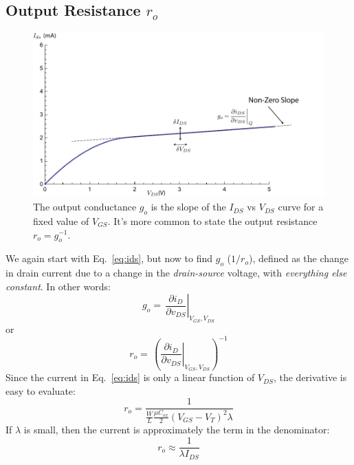 \subsection{Output Resistance \texorpdfstring{$r_o$}{}}
\begin{figure}[tb]
\centering
\includegraphics[width=.75\columnwidth]{ids_idsat_ro}
\caption{The output conductance $g_o$ is the slope of the $I_{DS}$ vs $V_{DS}$ curve for a fixed value of $V_{GS}$.  It's more common to state the output resistance $r_o = g_o^{-1}$.}
\label{fig:ids_idsat_ro}
\end{figure}
We again start with Eq.~\ref{eq:ids}, but now to find $g_o$ ($1/r_o$), defined as the change in drain current due to a change in the \textit{drain-source} voltage, with \textit{everything else constant}.  In other words:
    \begin{equation}
        {g_o} = \,{ {{{\left. {\frac{{\partial {i_D}}}{{\partial {v_{DS}}}}} \right|}_{{V_{GS}},{V_{DS}}}}} }
    \end{equation}
or
    \begin{equation}
        {r_o} = \,{\left( {{{\left. {\frac{{\partial {i_D}}}{{\partial {v_{DS}}}}} \right|}_{{V_{GS}},{V_{DS}}}}} \right)^{ - 1}}
    \end{equation}
Since the current in Eq.~\ref{eq:ids} is only a linear function of $V_{DS}$, the derivative is easy to evaluate:
    \begin{equation}
        {r_o} = \frac{1}{{\frac{W}{L}\frac{{\mu {C_{ox}}}}{2}{{({V_{GS}} - {V_T})}^2}\lambda }}
    \end{equation}
If $\lambda$ is small, then the current is approximately the term in the denominator:
    \begin{equation}
        {r_o} \approx \frac{1}{{\lambda {I_{DS}}}}
    \end{equation}
